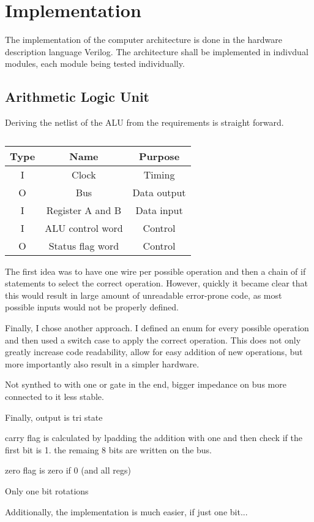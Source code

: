   \section{Implementation}
\label{sec:implementation}
The implementation of the computer architecture is done in the hardware description language Verilog. The architecture shall be implemented in indivdual modules, each module being tested individually.    

\subsection{Arithmetic Logic Unit}
Deriving the netlist of the ALU from the requirements is straight forward.

\begin{table}[H]
\begin{tabular}{ccc}
Type& Name & Purpose \\ \hline
I   & Clock & Timing \\
O   & Bus     & Data output         \\
I   & Register A and B & Data input \\
I   & ALU control word & Control \\
O   & Status flag word & Control
\end{tabular}
\caption{}
\label{tab:alu-i/o}
\end{table}

The first idea was to have one wire per possible operation and then a chain of if statements to select the correct operation. However, quickly it became clear that this would result in large amount of unreadable error-prone code, as most possible inputs would not be properly defined.

Finally, I chose another approach. I defined an enum for every possible operation and then used a switch case to apply the correct operation. This does not only greatly increase code readability, allow for easy addition of new operations, but more importantly also result in a simpler hardware. 

Not synthed to with one or gate in the end, bigger impedance on bus more connected to it less stable. 

Finally, output is tri state  

carry flag is calculated by lpadding the addition with one and then check if the first bit is 1. the remaing 8 bits are written on the bus. 

zero flag is zero if 0 (and all regs)


% 

Only one bit rotations 

Additionally, the implementation is much easier, if just one bit...
